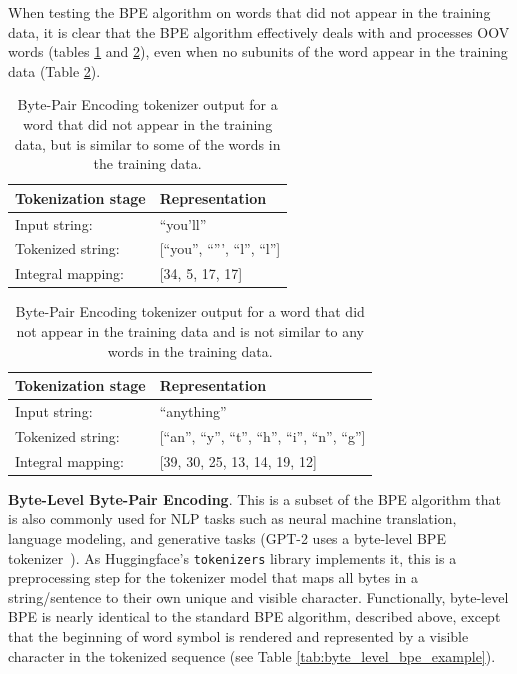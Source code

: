 \documentclass[12pt]{article}
\begin{document}
When testing the BPE algorithm on words that did not appear in the training data, it is clear that the BPE algorithm effectively deals with and
processes OOV words (tables \ref{tab:bpe_unk_similar} and \ref{tab:bpe_unk}), even when no subunits of the word appear in the training data (Table
\ref{tab:bpe_unk}).

\begin{table}[!t]
    \centering
    \begin{tabular}{l l}
        \toprule
        Tokenization stage & Representation                 \\
        \midrule
        Input string:      & ``you'll''                     \\
        Tokenized string:  & [``you'', ``''', ``l'', ``l''] \\
        Integral mapping:  & [34, 5, 17, 17]                \\
        \bottomrule
    \end{tabular}
    \caption{Byte-Pair Encoding tokenizer output for a word that did not appear in the training data, but is similar to some of the words in the
        training data.}
    \label{tab:bpe_unk_similar}
\end{table}

\begin{table}[!t]
    \centering
    \begin{tabular}{l l}
        \toprule
        Tokenization stage & Representation                                     \\
        \midrule
        Input string:      & ``anything''                                       \\
        Tokenized string:  & [``an'', ``y'', ``t'', ``h'', ``i'', ``n'', ``g''] \\
        Integral mapping:  & [39, 30, 25, 13, 14, 19, 12]                       \\
        \bottomrule
    \end{tabular}
    \caption{Byte-Pair Encoding tokenizer output for a word that did not appear in the training data and is not similar to any words in the training
        data.}
    \label{tab:bpe_unk}
\end{table}

\textbf{Byte-Level Byte-Pair Encoding}. This is a subset of the BPE algorithm that is also commonly used for NLP tasks such as neural machine
translation, language modeling, and generative tasks (GPT-2 uses a byte-level BPE tokenizer~\cite{radford_language_2019}). As Huggingface's
\lstinline|tokenizers| library implements it, this is a preprocessing step for the tokenizer model that maps all bytes in a string/sentence to
their own unique and visible character. Functionally, byte-level BPE is nearly identical to the standard BPE algorithm, described above, except that
the beginning of word symbol is rendered and represented by a visible character in the tokenized sequence (see Table
\ref{tab:byte_level_bpe_example}).
\end{document}
